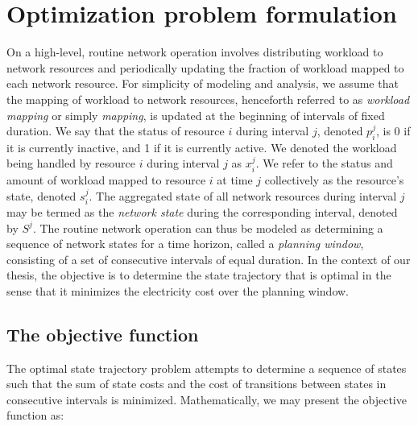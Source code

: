\section{Optimization problem formulation}
\label{sec:framework:optimization}
On a high-level, routine network operation involves distributing workload to network resources and periodically updating the fraction of workload mapped to each network resource. For simplicity of modeling and analysis, we assume that the mapping of workload to network resources, henceforth referred to as \textit{workload mapping} or simply \textit{mapping}, is updated at the beginning of intervals of fixed duration. We say that the status of resource $i$ during interval $j$, denoted $p_i^j$, is 0 if it is currently inactive, and 1 if it is currently active. We denoted the workload being handled by resource $i$ during interval $j$ as $x_i^j$. We refer to the status and amount of workload mapped to resource $i$ at time $j$ collectively as the resource's state, denoted $s_i^j$. The aggregated state of all network resources during interval $j$ may be termed as the \textit{network state} during the corresponding interval, denoted by $S^j$. The routine network operation can thus be modeled as determining a sequence of network states for a time horizon, called a \textit{planning window}, consisting of a set of consecutive intervals of equal duration. In the context of our thesis, the objective is to determine the state trajectory that is optimal in the sense that it minimizes the electricity cost over the planning window. %

\subsection{The objective function}
\label{subsec:framework:objective} %
The optimal state trajectory problem attempts to determine a sequence of states such that the sum of state costs and the cost of transitions between states in consecutive intervals is minimized. Mathematically, we may present the objective function as:

